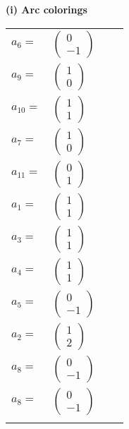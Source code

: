 \documentclass[1p]{elsarticle_modified}
\theoremstyle{definition}
\begin{document}
\flushleft \textbf{(i) Arc colorings}\\
\begin{tabular}{m{7pt} m{180pt} m{7pt} m{180pt} }
\flushright $a_{6}=$&$\begin{pmatrix}0\\-1\end{pmatrix}$ \\
\flushright $a_{9}=$&$\begin{pmatrix}1\\0\end{pmatrix}$ \\
\flushright $a_{10}=$&$\begin{pmatrix}1\\1\end{pmatrix}$ \\
\flushright $a_{7}=$&$\begin{pmatrix}1\\0\end{pmatrix}$ \\
\flushright $a_{11}=$&$\begin{pmatrix}0\\1\end{pmatrix}$ \\
\flushright $a_{1}=$&$\begin{pmatrix}1\\1\end{pmatrix}$ \\
\flushright $a_{3}=$&$\begin{pmatrix}1\\1\end{pmatrix}$ \\
\flushright $a_{4}=$&$\begin{pmatrix}1\\1\end{pmatrix}$ \\
\flushright $a_{5}=$&$\begin{pmatrix}0\\-1\end{pmatrix}$ \\
\flushright $a_{2}=$&$\begin{pmatrix}1\\2\end{pmatrix}$ \\
\flushright $a_{8}=$&$\begin{pmatrix}0\\-1\end{pmatrix}$\\ \flushright $a_{8}=$&$\begin{pmatrix}0\\-1\end{pmatrix}$\\&\end{tabular}
\end{document}
